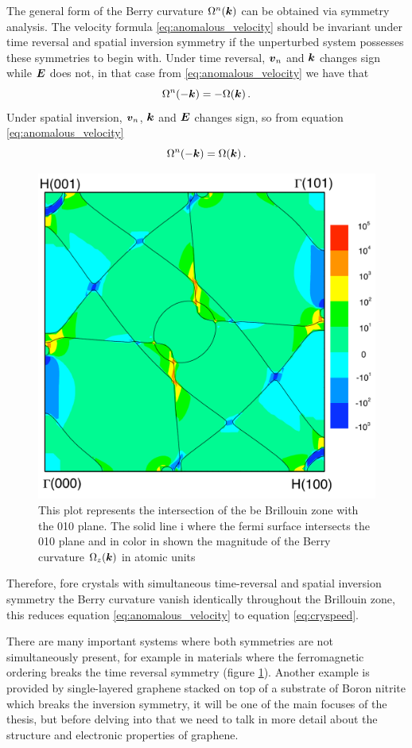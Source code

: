 The general form of the Berry curvature $\Omega^n(\boldsymbol{k})$ can be obtained via symmetry analysis. The velocity formula \ref{eq:anomalous_velocity} should be invariant under time reversal and spatial inversion symmetry if the unperturbed system possesses these symmetries to begin with. Under time reversal, $\boldsymbol{v}_n$ and $\boldsymbol{k}$ changes sign while $\boldsymbol{E}$ does not, in that case from \ref{eq:anomalous_velocity} we have that
\begin{equation}
    \Omega^n(-\boldsymbol{k})=-\Omega(\boldsymbol{k})\,.
\end{equation}
Under spatial inversion, $\boldsymbol{v}_n$, $\boldsymbol{k}$ and $\boldsymbol{E}$ changes sign, so from equation \ref{eq:anomalous_velocity}
\begin{equation}
    \Omega^n(-\boldsymbol{k})=\Omega(\boldsymbol{k})\,.
\end{equation}
\begin{figure}
    \includegraphics[width=.5\textwidth]{Immagini/topo/curvature_Fe.pdf}
    \caption{This plot represents the intersection of the be Brillouin zone with the 010 plane. The solid line i where the fermi surface intersects the 010 plane and in color in shown the magnitude of the Berry curvature $\Omega_z(\boldsymbol{k})$ in atomic units \cite{yao2004first}}
    \label{fig:berryferro}
\end{figure} 
Therefore, fore crystals with simultaneous time-reversal and spatial inversion symmetry the Berry curvature vanish identically throughout the Brillouin zone, this reduces equation \ref{eq:anomalous_velocity} to equation \ref{eq:cryspeed}.


There are many important systems where both symmetries are not simultaneously present, for example in materials where the ferromagnetic ordering breaks the time reversal symmetry (figure \ref{fig:berryferro}).
Another example is provided by single-layered graphene stacked on top of a substrate of Boron nitrite which breaks the inversion symmetry, it will be one of the main focuses of the thesis, but before delving into that we need to talk in more detail about the structure and electronic properties of graphene.

